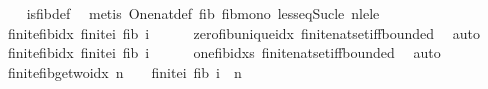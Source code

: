 \begin{isabellebody}
%
\isadelimproof
\ \ %
\endisadelimproof
%
\isatagproof
{}\isamarkupfalse%
\ is{\isacharunderscore}{\kern0pt}fib{\isacharunderscore}{\kern0pt}def\ \isamarkupfalse%
\ {\isacharparenleft}{\kern0pt}metis\ One{\isacharunderscore}{\kern0pt}nat{\isacharunderscore}{\kern0pt}def\ fib{\isacharunderscore}{\kern0pt}{}\ fib{\isacharunderscore}{\kern0pt}mono\ less{\isacharunderscore}{\kern0pt}eq{\isacharunderscore}{\kern0pt}Suc{\isacharunderscore}{\kern0pt}le\ nle{\isacharunderscore}{\kern0pt}le{\isacharparenright}{\kern0pt}%
\endisatagproof
{\isafoldproof}%
%
\isadelimproof
\isanewline
%
\endisadelimproof
\isanewline
{}\isamarkupfalse%
\ finite{\isacharunderscore}{\kern0pt}fib{}{\isacharunderscore}{\kern0pt}idx{\isacharcolon}{\kern0pt}\ {\isachardoublequoteopen}finite{\isacharparenleft}{\kern0pt}{\isacharbraceleft}{\kern0pt}i{\isachardot}{\kern0pt}\ fib\ i\ {\isacharequal}{\kern0pt}\ {}{\isacharbraceright}{\kern0pt}{\isacharparenright}{\kern0pt}{\isachardoublequoteclose}\isanewline
%
\isadelimproof
\ \ %
\endisadelimproof
%
\isatagproof
{}\isamarkupfalse%
\ zero{\isacharunderscore}{\kern0pt}fib{\isacharunderscore}{\kern0pt}unique{\isacharunderscore}{\kern0pt}idx\ finite{\isacharunderscore}{\kern0pt}nat{\isacharunderscore}{\kern0pt}set{\isacharunderscore}{\kern0pt}iff{\isacharunderscore}{\kern0pt}bounded\ \isamarkupfalse%
\ auto%
\endisatagproof
{\isafoldproof}%
%
\isadelimproof
\isanewline
%
\endisadelimproof
\isanewline
{}\isamarkupfalse%
\ finite{\isacharunderscore}{\kern0pt}fib{}{\isacharunderscore}{\kern0pt}idx{\isacharcolon}{\kern0pt}\ {\isachardoublequoteopen}finite{\isacharparenleft}{\kern0pt}{\isacharbraceleft}{\kern0pt}i{\isachardot}{\kern0pt}\ fib\ i\ {\isacharequal}{\kern0pt}\ {}{\isacharbraceright}{\kern0pt}{\isacharparenright}{\kern0pt}{\isachardoublequoteclose}\isanewline
%
\isadelimproof
\ \ %
\endisadelimproof
%
\isatagproof
{}\isamarkupfalse%
\ one{\isacharunderscore}{\kern0pt}fib{\isacharunderscore}{\kern0pt}idxs\ finite{\isacharunderscore}{\kern0pt}nat{\isacharunderscore}{\kern0pt}set{\isacharunderscore}{\kern0pt}iff{\isacharunderscore}{\kern0pt}bounded\ \isamarkupfalse%
\ auto%
\endisatagproof
{\isafoldproof}%
%
\isadelimproof
\isanewline
%
\endisadelimproof
\isanewline
{}\isamarkupfalse%
\ finite{\isacharunderscore}{\kern0pt}fib{\isacharunderscore}{\kern0pt}ge{\isacharunderscore}{\kern0pt}two{\isacharunderscore}{\kern0pt}idx{\isacharcolon}{\kern0pt}\ {\isachardoublequoteopen}n\ {\isasymge}\ {}\ {\isasymLongrightarrow}\ finite{\isacharparenleft}{\kern0pt}{\isacharbraceleft}{\kern0pt}i{\isachardot}{\kern0pt}\ fib\ i\ {\isacharequal}{\kern0pt}\ n{\isacharbraceright}{\kern0pt}{\isacharparenright}{\kern0pt}{\isachardoublequoteclose}\isanewline

\end{isabellebody}
